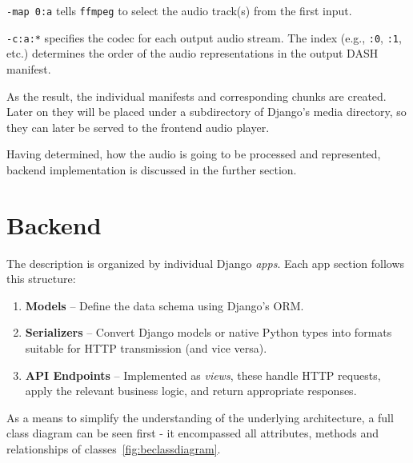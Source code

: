 \texttt{-map 0:a} tells \texttt{ffmpeg} to select the audio track(s) from the first input.

\texttt{-c:a:*} specifies the codec for each output audio stream.
The index (e.g., \texttt{:0}, \texttt{:1}, etc.) determines the order of the audio representations
in the output DASH manifest.

As the result, the individual manifests and corresponding chunks are created.
Later on they will be placed under a subdirectory
of Django's media directory, so they can later be served to the frontend audio player.

Having determined, how the audio is going to be processed and represented, backend implementation is
discussed in the further section.


\section{Backend}
The description is organized by individual Django \textit{apps}.
Each app section follows this structure:

\begin{enumerate}
    \item \textbf{Models} – Define the data schema using Django's ORM.
    \item \textbf{Serializers} – Convert Django models or native Python types into
    formats suitable for HTTP transmission (and vice versa).
    \item \textbf{API Endpoints} – Implemented as \textit{views}, these handle HTTP requests,
    apply the relevant business logic, and return appropriate responses.
\end{enumerate}

As a means to simplify the understanding of the underlying architecture, a full class diagram can be
seen first - it encompassed all attributes, methods and relationships of classes~\ref{fig:beclassdiagram}.

